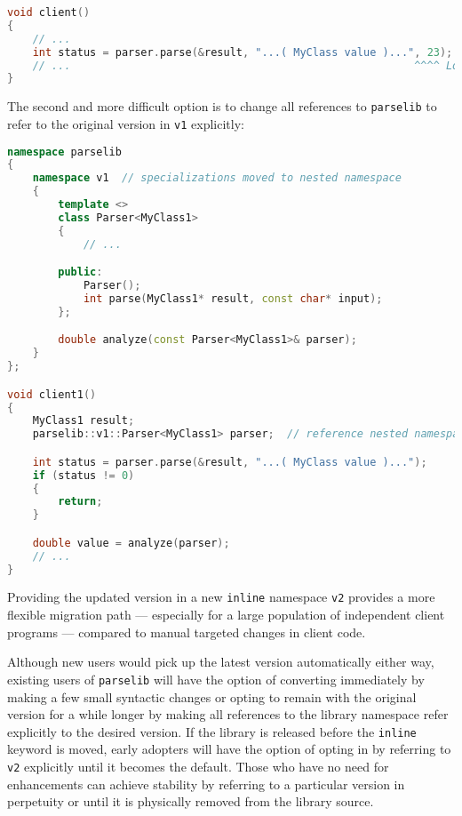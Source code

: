 \begin{lstlisting}[language=C++]
void client()
{
    // ...
    int status = parser.parse(&result, "...( MyClass value )...", 23);
    // ...                                                      ^^^^ Look here!
}
\end{lstlisting}
    
\noindent The second and more difficult option is to change all references to
\texttt{parselib} to refer to the original version in \texttt{v1}
explicitly:

\begin{lstlisting}[language=C++]
namespace parselib
{
    namespace v1  // specializations moved to nested namespace
    {
        template <>
        class Parser<MyClass1>
        {
            // ...

        public:
            Parser();
            int parse(MyClass1* result, const char* input);
        };

        double analyze(const Parser<MyClass1>& parser);
    }
};

void client1()
{
    MyClass1 result;
    parselib::v1::Parser<MyClass1> parser;  // reference nested namespace (ù{\codeincomments{v1}}ù)

    int status = parser.parse(&result, "...( MyClass value )...");
    if (status != 0)
    {
        return;
    }

    double value = analyze(parser);
    // ...
}
\end{lstlisting}
    
\noindent Providing the updated version in a new \texttt{inline} namespace
\texttt{v2} provides a more flexible migration path --- especially for a
large population of independent client programs --- compared to manual
targeted changes in client code.

Although new users would pick up the latest version automatically either
way, existing users of \texttt{parselib} will have the option of
converting immediately by making a few small syntactic changes or
opting to remain with the original version for a while longer by making
all references to the library namespace refer explicitly to the desired
version. If the library is released before the \texttt{inline} keyword
is moved, early adopters will have the option of opting in by referring
to \texttt{v2} explicitly until it becomes the default. Those who have
no need for enhancements can achieve stability by referring to a
particular version in perpetuity or until it is physically removed from
the library source.

